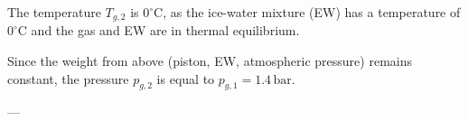 The temperature \( T_{g,2} \) is \( 0^\circ\text{C} \), as the ice-water mixture (EW) has a temperature of \( 0^\circ\text{C} \) and the gas and EW are in thermal equilibrium.  

Since the weight from above (piston, EW, atmospheric pressure) remains constant, the pressure \( p_{g,2} \) is equal to \( p_{g,1} = 1.4 \, \text{bar} \).  

---